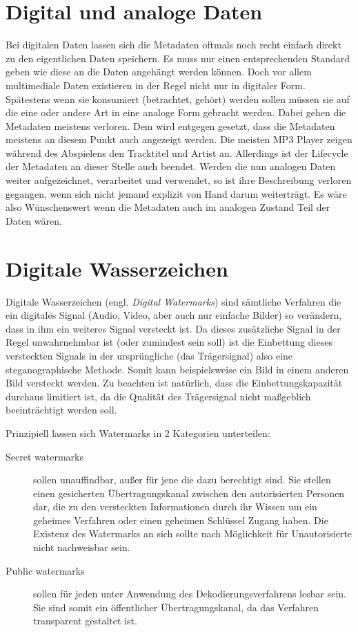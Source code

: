 \section{Digital und analoge Daten}

Bei digitalen Daten lassen sich die Metadaten oftmals noch recht einfach direkt zu den eigentlichen Daten speichern. Es muss nur einen entsprechenden Standard geben wie diese an die Daten angehängt werden können. Doch vor allem multimediale Daten existieren in der Regel nicht nur in digitaler Form. Spätestens wenn sie konsumiert (betrachtet, gehört) werden sollen müssen sie auf die eine oder andere Art in eine analoge Form gebracht werden. Dabei gehen die Metadaten meistens verloren. Dem wird entgegen gesetzt, dass die Metadaten meistens an diesem Punkt auch angezeigt werden. Die meisten MP3 Player zeigen während des Abspielens den Tracktitel und Artist an. Allerdings ist der Lifecycle der Metadaten an dieser Stelle auch beendet. Werden die nun analogen Daten weiter aufgezeichnet, verarbeitet und verwendet, so ist ihre Beschreibung verloren gegangen, wenn sich nicht jemand explizit \glqq{}von Hand\grqq{} darum weiterträgt. Es wäre also Wünschenswert wenn die Metadaten auch im analogen Zustand Teil der Daten wären. 

\section{Digitale Wasserzeichen}

Digitale Wasserzeichen (engl. \textit{Digital Watermarks}) sind sämtliche Verfahren die ein digitales Signal (Audio, Video, aber auch nur einfache Bilder) so verändern, dass in ihm ein weiteres Signal versteckt ist. Da dieses zusätzliche Signal in der Regel unwahrnehmbar ist (oder zumindest sein soll) ist die Einbettung dieses \glqq{}versteckten Signals\grqq{} in der ursprüngliche (das \glqq{}Trägersignal\grqq{}) also eine steganographische Methode.
Somit kann beispielsweise ein Bild in einem anderen Bild versteckt werden. Zu beachten ist natürlich, dass die Einbettungskapazität durchaus limitiert ist, da die Qualität des Trägersignal nicht maßgeblich beeinträchtigt werden soll. 

Prinzipiell lassen sich Watermarks in 2 Kategorien unterteilen\cite{arnold2000audio}: 

\begin{description}
	
	\item[Secret watermarks] sollen unauffindbar, außer für jene die dazu berechtigt sind. Sie stellen einen gesicherten Übertragungskanal zwischen den autorisierten Personen dar, die zu den versteckten Informationen durch ihr Wissen um ein geheimes Verfahren oder einen geheimen Schlüssel Zugang haben. Die Existenz des Watermarks an sich sollte nach Möglichkeit für Unautorisierte nicht nachweisbar sein. 
	
	\item[Public watermarks] sollen für jeden unter Anwendung des Dekodierungsverfahrens lesbar sein. Sie sind somit ein öffentlicher Übertragungskanal, da das Verfahren transparent gestaltet ist.
	
\end{description}

